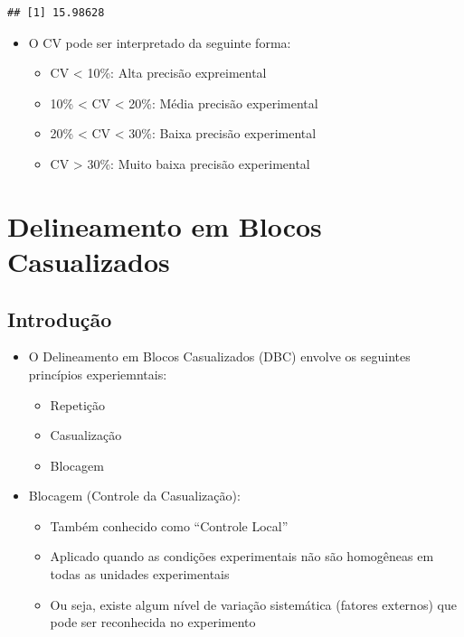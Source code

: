 \documentclass[
]{book}
\providecommand{\tightlist}{%
  \setlength{\itemsep}{0pt}\setlength{\parskip}{0pt}}
\begin{document}
\begin{verbatim}
## [1] 15.98628
\end{verbatim}

\begin{itemize}
\tightlist
\item
  O CV pode ser interpretado da seguinte forma:

  \begin{itemize}
  \tightlist
  \item
    CV \textless{} 10\%: Alta precisão expreimental
  \item
    10\% \textless{} CV \textless{} 20\%: Média precisão experimental
  \item
    20\% \textless{} CV \textless{} 30\%: Baixa precisão experimental
  \item
    CV \textgreater{} 30\%: Muito baixa precisão experimental
  \end{itemize}
\end{itemize}

\chapter{Delineamento em Blocos Casualizados}\label{delineamento-em-blocos-casualizados}

\section{Introdução}\label{introduuxe7uxe3o-1}

\begin{itemize}
\tightlist
\item
  O Delineamento em Blocos Casualizados (DBC) envolve os
  seguintes princípios experiemntais:

  \begin{itemize}
  \tightlist
  \item
    Repetição
  \item
    Casualização
  \item
    Blocagem
  \end{itemize}
\item
  Blocagem (Controle da Casualização):

  \begin{itemize}
  \tightlist
  \item
    Também conhecido como ``Controle Local''
  \item
    Aplicado quando as condições experimentais não são homogêneas em todas as unidades experimentais
  \item
    Ou seja, existe algum nível de variação sistemática (fatores externos) que pode ser reconhecida no experimento
  \end{itemize}
\end{itemize}
\end{document}
